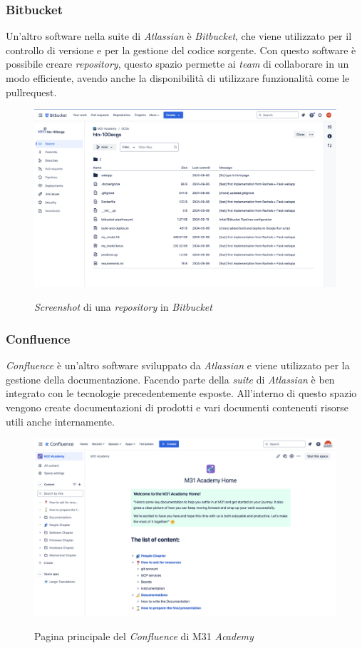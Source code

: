 \subsubsection*{Bitbucket}\noindent
Un'altro software nella suite di \textit{Atlassian} è \textit{Bitbucket}, che viene utilizzato per il controllo di versione e per la gestione del codice sorgente.
Con questo software è possibile creare \textit{repository}, questo spazio permette ai \textit{team} di collaborare in un modo efficiente, avendo anche la disponibilità di utilizzare funzionalità come le \gls{pullrequest}.
\begin{figure}[H]
    \centering
    \includegraphics[alt={\textit{Screenshot} di una \textit{repository} in \textit{Bitbucket}}, width=0.9\columnwidth]{img/bitbucket.png}
    \caption{\textit{Screenshot} di una \textit{repository} in \textit{Bitbucket}}
    \label{fig:bitbucket}
\end{figure}
\subsubsection*{Confluence}\noindent
\textit{Confluence} è un'altro software sviluppato da \textit{Atlassian} e viene utilizzato per la gestione della documentazione.
Facendo parte della \textit{suite} di \textit{Atlassian} è ben integrato con le tecnologie precedentemente esposte.
All'interno di questo spazio vengono create documentazioni di prodotti e vari documenti contenenti risorse utili anche internamente.
\begin{figure}[H]
    \centering
    \includegraphics[alt={Pagina principale del \textit{Confluence} di M31 \textit{Academy}}, width=0.9\columnwidth]{img/confluence.png}
    \caption{Pagina principale del \textit{Confluence} di M31 \textit{Academy}}
    \label{fig:confluence}
\end{figure}
